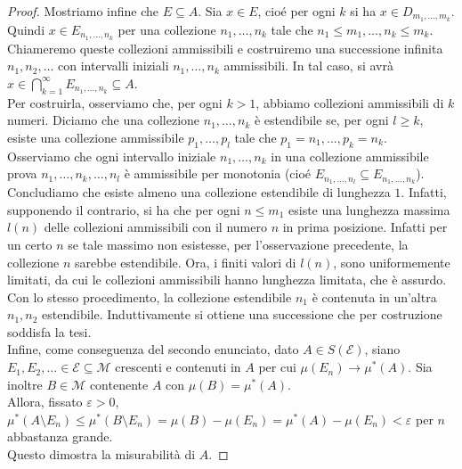 \documentclass[a4paper, twoside,openright]{article}
\newcommand{\ra}{\rightarrow}
\newcommand{\e}{\varepsilon}
\newcommand{\<}{\langle}
\renewcommand{\>}{\rangle}
\begin{document}
\begin{proof}
	Mostriamo infine che $E \subseteq A$. Sia $x \in E$, cioé per ogni $k$ si ha $x \in D_{m_{1}, \ldots, m_{k}}$. Quindi $x \in E_{n_{1}, \ldots, n_{k}}$ per una collezione $n_{1}, \ldots, n_{k}$ tale che $n_{1} \leq m_{1}, \ldots, n_{k} \leq m_{k}$.\\
	Chiameremo queste collezioni ammissibili e costruiremo una successione infinita $n_{1}, n_{2}, \ldots$ con intervalli iniziali $n_{1}, \ldots, n_{k}$ ammissibili.	In tal caso, si avrà $x \in \bigcap_{k=1}^{\infty} E_{n_{1}, \ldots, n_{k}} \subseteq A$.\\
	Per costruirla, osserviamo che, per ogni $k>1$, abbiamo collezioni ammissibili di $k$ numeri. Diciamo che una collezione $n_{1}, \ldots, n_{k}$ è estendibile se, per ogni $l \geq k$, esiste una collezione ammissibile $p_{1}, \ldots, p_{l}$ tale che $p_1=n_1,...,p_k=n_k$.\\
	Osserviamo che ogni intervallo iniziale $n_{1}, \ldots, n_{k}$ in una collezione ammissibile prova $n_{1}, \ldots, n_{k}, \ldots, n_{l}$ è ammissibile per monotonia (cioé $E_{n_{1}, \ldots, n_{l}} \subseteq E_{n_{1}, \ldots, n_{k}}$).\\
	Concludiamo che esiste almeno una collezione estendibile di lunghezza $1$. Infatti, supponendo il contrario, si ha che per ogni $n \leq m_{1}$ esiste una lunghezza massima $l(n)$ delle collezioni ammissibili con il numero $n$ in prima posizione. Infatti per un certo $n$ se tale massimo non esistesse, per l'osservazione precedente, la collezione $n$ sarebbe estendibile. Ora, i finiti valori di $l(n)$, sono uniformemente limitati, da cui le collezioni ammissibili hanno lunghezza limitata, che è assurdo.\\
	Con lo stesso procedimento, la collezione estendibile $n_{1}$ è contenuta in un'altra $n_{1}, n_{2}$ estendibile. Induttivamente si ottiene una successione che per costruzione soddisfa la tesi.\\
	Infine, come conseguenza del secondo enunciato, dato $A \in S(\mathcal{E})$, siano $E_1, E_2 ,... \in \mathcal{E} \subseteq \mathcal{M} $ crescenti e contenuti in $A$ per cui $\mu(E_n) \ra \mu^*(A)$. Sia inoltre $B \in \mathcal{M}$ contenente $A$ con $\mu(B)=\mu^*(A)$.\\
	Allora, fissato $\e >0$, $\mu^*(A \setminus E_n) \leq \mu^*(B \setminus E_n)  = \mu(B) - \mu(E_n) = \mu^*(A)  - \mu(E_n) < \e $  per $n$ abbastanza grande.\\
	Questo dimostra la misurabilità di $A$.
\end{proof}
\end{document}
